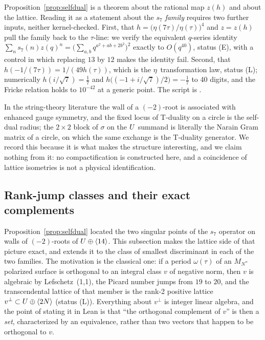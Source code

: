 \begin{remark}\label{rem:selfdual-status}
Proposition~\ref{prop:selfdual} is a theorem about the rational map $z(h)$ and
about the lattice. Reading it as a statement about the $s_7$ \emph{family}
requires two further inputs, neither kernel-checked. First, that
$h=\bigl(\eta(7\tau)/\eta(\tau)\bigr)^4$ and $z=z(h)$ pull the family back to the
$\tau$-line: we verify the equivalent $q$-series identity
$\sum_n s_7(n)z(q)^n = \bigl(\sum_{a,b}q^{a^2+ab+2b^2}\bigr)^2$ exactly to
$O(q^{40})$, status (E), with a control in which replacing $13$ by $12$ makes the
identity fail. Second, that $h(-1/(7\tau)) = 1/(49h(\tau))$, which is the
$\eta$~transformation law, status (L); numerically $h(i/\sqrt7)=\tfrac17$ and
$h\bigl((-1+i/\sqrt7)/2\bigr)=-\tfrac17$ to 40 digits, and the Fricke relation
holds to $10^{-42}$ at a generic point. The script is
.
\end{remark}

\begin{remark}\label{rem:selfdual-nophysics}
In the string-theory literature the wall of a $(-2)$-root is associated with
enhanced gauge symmetry, and the fixed locus of T-duality on a circle is the
self-dual radius; the $2\times2$ block of $\sigma$ on the $U$ summand is
literally the Narain Gram matrix of a circle, on which the same exchange is the
T-duality generator. We record this because it is what makes the structure
interesting, and we claim nothing from it: no compactification is constructed
here, and a coincidence of lattice isometries is not a physical identification.
\end{remark}

\subsection{Rank-jump classes and their exact complements}\label{subsec:rankjump}

Proposition~\ref{prop:selfdual} located the two singular points of the $s_7$
operator on walls of $(-2)$-roots of $U\oplus\langle 14\rangle$. This subsection makes
the lattice side of that picture exact, and extends it to the class of smallest
discriminant in each of the two families. The motivation is the classical one:
if a period $\omega(\tau)$ of an $M_N$-polarized surface is orthogonal to an
integral class $v$ of negative norm, then $v$ is algebraic by Lefschetz~(1,1),
the Picard number jumps from $19$ to $20$, and the transcendental lattice of
that member is the rank-2 positive lattice $v^{\perp}\subset U\oplus\langle 2N\rangle$
(status (L)). Everything about $v^{\perp}$ is integer linear algebra, and the
point of stating it in Lean is that ``the orthogonal complement of $v$'' is
then a \emph{set}, characterized by an equivalence, rather than two vectors
that happen to be orthogonal to $v$.

